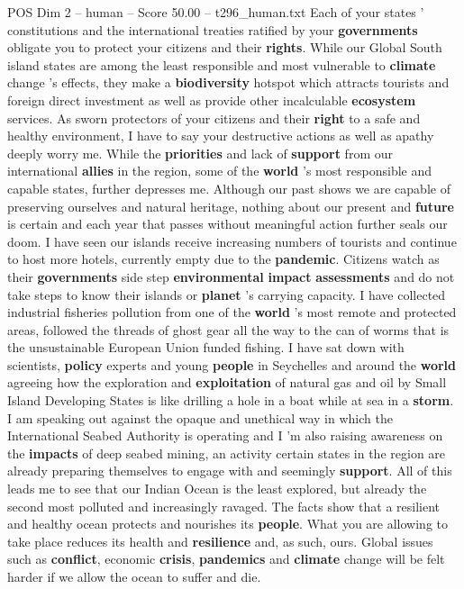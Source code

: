 \begin{textsample}{POS Dim 2 – human – Score 50.00 – t296\_human.txt}
Each of your states ’ constitutions and the international treaties ratified by your \textbf{governments} obligate you to protect your citizens and their \textbf{rights}.
While our Global South island states are among the least responsible and most vulnerable to \textbf{climate} change ’s effects, they make a \textbf{biodiversity} hotspot which attracts tourists and foreign direct investment as well as provide other incalculable \textbf{ecosystem} services.
As sworn protectors of your citizens and their \textbf{right} to a safe and healthy environment, I have to say your destructive actions as well as apathy deeply worry me.
While the \textbf{priorities} and lack of \textbf{support} from our international \textbf{allies} in the region, some of the \textbf{world} ’s most responsible and capable states, further depresses me.
Although our past shows we are capable of preserving ourselves and natural heritage, nothing about our present and \textbf{future} is certain and each year that passes without meaningful action further seals our doom.
I have seen our islands receive increasing numbers of tourists and continue to host more hotels, currently empty due to the \textbf{pandemic}.
Citizens watch as their \textbf{governments} side step \textbf{environmental} \textbf{impact} \textbf{assessments} and do not take steps to know their islands or \textbf{planet} ’s carrying capacity.
I have collected industrial fisheries pollution from one of the \textbf{world} ’s most remote and protected areas, followed the threads of ghost gear all the way to the can of worms that is the unsustainable European Union funded fishing.
I have sat down with scientists, \textbf{policy} experts and young \textbf{people} in Seychelles and around the \textbf{world} agreeing how the exploration and \textbf{exploitation} of natural gas and oil by Small Island Developing States is like drilling a hole in a boat while at sea in a \textbf{storm}.
I am speaking out against the opaque and unethical way in which the International Seabed Authority is operating and I ’m also raising awareness on the \textbf{impacts} of deep seabed mining, an activity certain states in the region are already preparing themselves to engage with and seemingly \textbf{support}.
All of this leads me to see that our Indian Ocean is the least explored, but already the second most polluted and increasingly ravaged.
The facts show that a resilient and healthy ocean protects and nourishes its \textbf{people}.
What you are allowing to take place reduces its health and \textbf{resilience} and, as such, ours.
Global issues such as \textbf{conflict}, economic \textbf{crisis}, \textbf{pandemics} and \textbf{climate} change will be felt harder if we allow the ocean to suffer and die.

\end{textsample}
